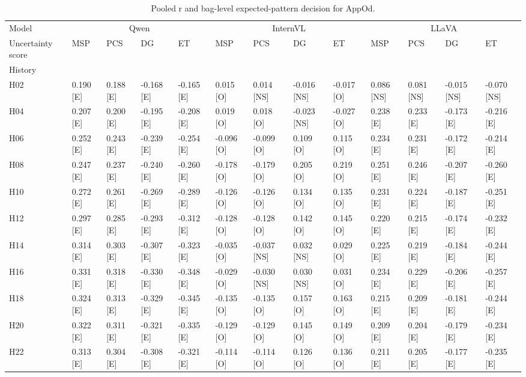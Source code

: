 \begin{table}[tbp]
\caption{Pooled r and bag-level expected-pattern decision for AppOd.}
\label{tab:rq2a-expected-pattern-appod}
\begin{tabular}{lllllllllllll}
\toprule
Model & \multicolumn{4}{c}{Qwen} & \multicolumn{4}{c}{InternVL} & \multicolumn{4}{c}{LLaVA} \\
Uncertainty score & MSP & PCS & DG & ET & MSP & PCS & DG & ET & MSP & PCS & DG & ET \\
History &  &  &  &  &  &  &  &  &  &  &  &  \\
\midrule
H02 & 0.190 [E] & 0.188 [E] & -0.168 [E] & -0.165 [E] & 0.015 [O] & 0.014 [NS] & -0.016 [NS] & -0.017 [O] & 0.086 [NS] & 0.081 [NS] & -0.015 [NS] & -0.070 [NS] \\
H04 & 0.207 [E] & 0.200 [E] & -0.195 [E] & -0.208 [E] & 0.019 [O] & 0.018 [O] & -0.023 [NS] & -0.027 [O] & 0.238 [E] & 0.233 [E] & -0.173 [E] & -0.216 [E] \\
H06 & 0.252 [E] & 0.243 [E] & -0.239 [E] & -0.254 [E] & -0.096 [O] & -0.099 [O] & 0.109 [O] & 0.115 [O] & 0.234 [E] & 0.231 [E] & -0.172 [E] & -0.214 [E] \\
H08 & 0.247 [E] & 0.237 [E] & -0.240 [E] & -0.260 [E] & -0.178 [O] & -0.179 [O] & 0.205 [O] & 0.219 [O] & 0.251 [E] & 0.246 [E] & -0.207 [E] & -0.260 [E] \\
H10 & 0.272 [E] & 0.261 [E] & -0.269 [E] & -0.289 [E] & -0.126 [O] & -0.126 [O] & 0.134 [O] & 0.135 [O] & 0.231 [E] & 0.224 [E] & -0.187 [E] & -0.251 [E] \\
H12 & 0.297 [E] & 0.285 [E] & -0.293 [E] & -0.312 [E] & -0.128 [O] & -0.128 [O] & 0.142 [O] & 0.145 [O] & 0.220 [E] & 0.215 [E] & -0.174 [E] & -0.232 [E] \\
H14 & 0.314 [E] & 0.303 [E] & -0.307 [E] & -0.323 [E] & -0.035 [O] & -0.037 [NS] & 0.032 [NS] & 0.029 [O] & 0.225 [E] & 0.219 [E] & -0.184 [E] & -0.244 [E] \\
H16 & 0.331 [E] & 0.318 [E] & -0.330 [E] & -0.348 [E] & -0.029 [O] & -0.030 [NS] & 0.030 [NS] & 0.031 [O] & 0.234 [E] & 0.229 [E] & -0.206 [E] & -0.257 [E] \\
H18 & 0.324 [E] & 0.313 [E] & -0.329 [E] & -0.345 [E] & -0.135 [O] & -0.135 [O] & 0.157 [O] & 0.163 [O] & 0.215 [E] & 0.209 [E] & -0.181 [E] & -0.244 [E] \\
H20 & 0.322 [E] & 0.311 [E] & -0.321 [E] & -0.335 [E] & -0.129 [O] & -0.129 [O] & 0.145 [O] & 0.149 [O] & 0.209 [E] & 0.204 [E] & -0.179 [E] & -0.234 [E] \\
H22 & 0.313 [E] & 0.304 [E] & -0.308 [E] & -0.321 [E] & -0.114 [O] & -0.114 [O] & 0.126 [O] & 0.136 [O] & 0.211 [E] & 0.205 [E] & -0.177 [E] & -0.235 [E] \\

\end{tabular}
\end{table}
